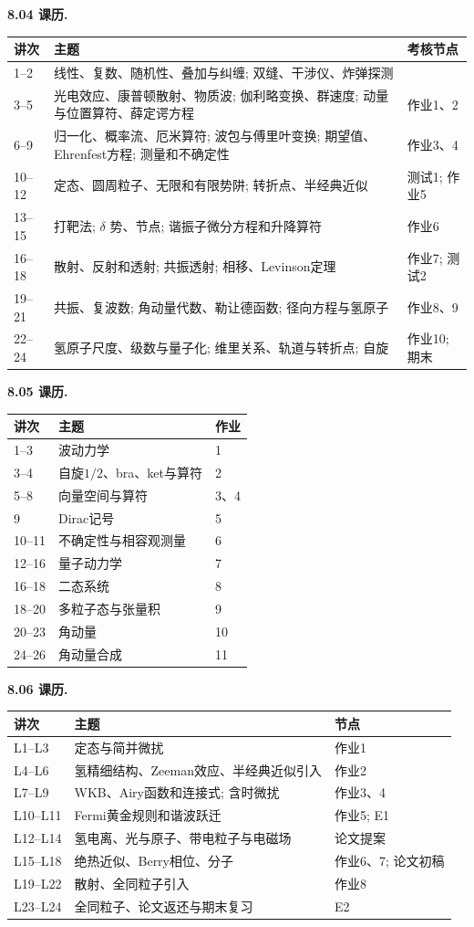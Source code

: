 \noindent\textbf{8.04 课历.}
\begin{longtable}{p{}p{}p{}}
\toprule 讲次 & 主题 & 考核节点\\\midrule\endhead
1--2 & 线性、复数、随机性、叠加与纠缠; 双缝、干涉仪、炸弹探测 & \\
3--5 & 光电效应、康普顿散射、物质波; 伽利略变换、群速度; 动量与位置算符、薛定谔方程 & 作业1、2\\
6--9 & 归一化、概率流、厄米算符; 波包与傅里叶变换; 期望值、Ehrenfest方程; 测量和不确定性 & 作业3、4\\
10--12 & 定态、圆周粒子、无限和有限势阱; 转折点、半经典近似 & 测试1; 作业5\\
13--15 & 打靶法; $\delta$ 势、节点; 谐振子微分方程和升降算符 & 作业6\\
16--18 & 散射、反射和透射; 共振透射; 相移、Levinson定理 & 作业7; 测试2\\
19--21 & 共振、复波数; 角动量代数、勒让德函数; 径向方程与氢原子 & 作业8、9\\
22--24 & 氢原子尺度、级数与量子化; 维里关系、轨道与转折点; 自旋 & 作业10; 期末\\
\bottomrule
\end{longtable}
\noindent\textbf{8.05 课历.}
\begin{longtable}{p{}p{}p{}}
\toprule 讲次 & 主题 & 作业\\\midrule\endhead
1--3 & 波动力学 & 1\\
3--4 & 自旋$1/2$、bra、ket与算符 & 2\\
5--8 & 向量空间与算符 & 3、4\\
9 & Dirac记号 & 5\\
10--11 & 不确定性与相容观测量 & 6\\
12--16 & 量子动力学 & 7\\
16--18 & 二态系统 & 8\\
18--20 & 多粒子态与张量积 & 9\\
20--23 & 角动量 & 10\\
24--26 & 角动量合成 & 11\\
\bottomrule
\end{longtable}
\noindent\textbf{8.06 课历.}
\begin{longtable}{p{}p{}p{}}
\toprule 讲次 & 主题 & 节点\\\midrule\endhead
L1--L3 & 定态与简并微扰 & 作业1\\
L4--L6 & 氢精细结构、Zeeman效应、半经典近似引入 & 作业2\\
L7--L9 & WKB、Airy函数和连接式; 含时微扰 & 作业3、4\\
L10--L11 & Fermi黄金规则和谐波跃迁 & 作业5; E1\\
L12--L14 & 氢电离、光与原子、带电粒子与电磁场 & 论文提案\\
L15--L18 & 绝热近似、Berry相位、分子 & 作业6、7; 论文初稿\\
L19--L22 & 散射、全同粒子引入 & 作业8\\
L23--L24 & 全同粒子、论文返还与期末复习 & E2\\
\bottomrule
\end{longtable}

